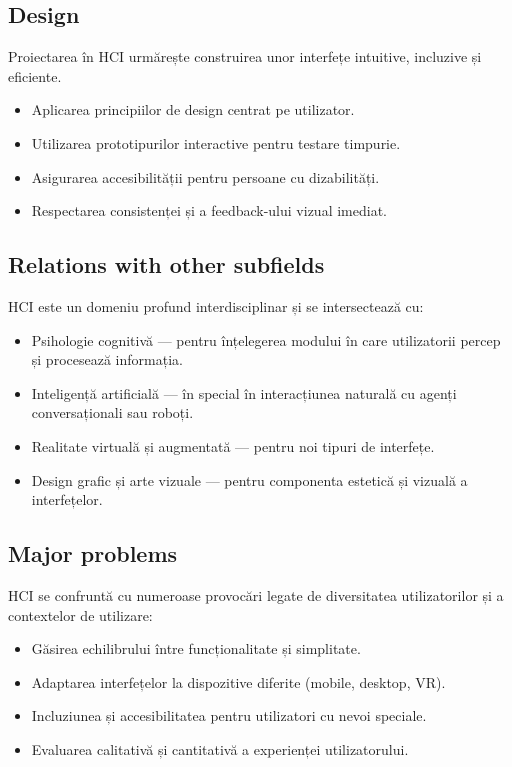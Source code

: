 \documentclass[12pt, letterpaper]{article}
\begin{document}
\subsection*{Design}
Proiectarea în HCI urmărește construirea unor interfețe intuitive, incluzive și eficiente.
\begin{itemize}
    \item Aplicarea principiilor de design centrat pe utilizator.
    \item Utilizarea prototipurilor interactive pentru testare timpurie.
    \item Asigurarea accesibilității pentru persoane cu dizabilități.
    \item Respectarea consistenței și a feedback-ului vizual imediat.
\end{itemize}

\subsection*{Relations with other subfields}
HCI este un domeniu profund interdisciplinar și se intersectează cu:
\begin{itemize}
    \item Psihologie cognitivă — pentru înțelegerea modului în care utilizatorii percep și procesează informația.
    \item Inteligență artificială — în special în interacțiunea naturală cu agenți conversaționali sau roboți.
    \item Realitate virtuală și augmentată — pentru noi tipuri de interfețe.
    \item Design grafic și arte vizuale — pentru componenta estetică și vizuală a interfețelor.
\end{itemize}

\subsection*{Major problems}
HCI se confruntă cu numeroase provocări legate de diversitatea utilizatorilor și a contextelor de utilizare:
\begin{itemize}
    \item Găsirea echilibrului între funcționalitate și simplitate.
    \item Adaptarea interfețelor la dispozitive diferite (mobile, desktop, VR).
    \item Incluziunea și accesibilitatea pentru utilizatori cu nevoi speciale.
    \item Evaluarea calitativă și cantitativă a experienței utilizatorului.
\end{itemize}
\end{document}
